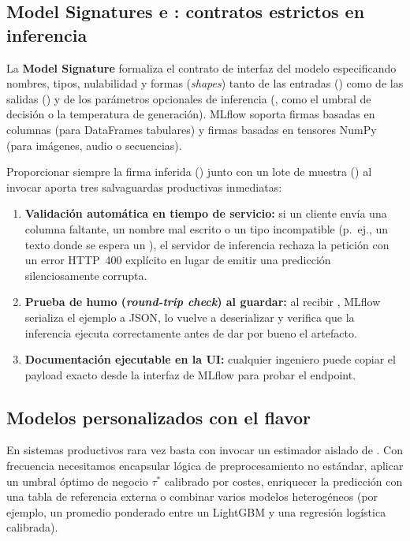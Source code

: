 \subsection{Model Signatures e : contratos estrictos en inferencia}

La \textbf{Model Signature} formaliza el contrato de interfaz del modelo especificando nombres, tipos, nulabilidad y formas (\textit{shapes}) tanto de las entradas () como de las salidas () y de los parámetros opcionales de inferencia (, como el umbral de decisión o la temperatura de generación). MLflow soporta firmas basadas en columnas (para DataFrames tabulares) y firmas basadas en tensores NumPy (para imágenes, audio o secuencias).

Proporcionar siempre la firma inferida () junto con un lote de muestra () al invocar  aporta tres salvaguardas productivas inmediatas:
\begin{enumerate}
  \item \textbf{Validación automática en tiempo de servicio:} si un cliente envía una columna faltante, un nombre mal escrito o un tipo incompatible (p.~ej., un texto donde se espera un ), el servidor de inferencia rechaza la petición con un error HTTP~400 explícito en lugar de emitir una predicción silenciosamente corrupta.
  \item \textbf{Prueba de humo (\textit{round-trip check}) al guardar:} al recibir , MLflow serializa el ejemplo a JSON, lo vuelve a deserializar y verifica que la inferencia ejecuta correctamente antes de dar por bueno el artefacto.
  \item \textbf{Documentación ejecutable en la UI:} cualquier ingeniero puede copiar el payload exacto desde la interfaz de MLflow para probar el endpoint.
\end{enumerate}

\subsection{Modelos personalizados con el flavor }

En sistemas productivos rara vez basta con invocar un estimador aislado de . Con frecuencia necesitamos encapsular lógica de preprocesamiento no estándar, aplicar un umbral óptimo de negocio $\tau^*$ calibrado por costes, enriquecer la predicción con una tabla de referencia externa o combinar varios modelos heterogéneos (por ejemplo, un promedio ponderado entre un LightGBM y una regresión logística calibrada).


